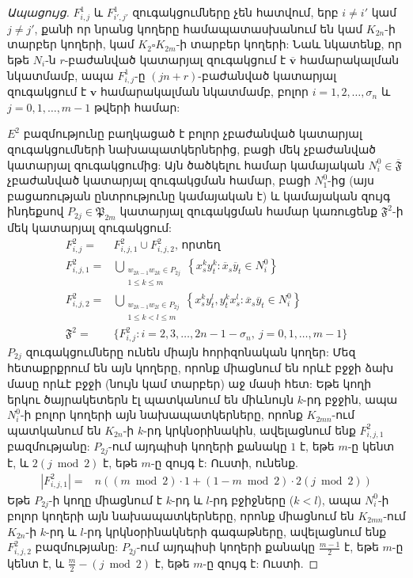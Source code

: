 \begin{proof}[Ապացույց]
$F^1_{i,j}$ և $F^1_{i',j'}$ զուգակցումները չեն հատվում, երբ $i \ne i'$ կամ $j \ne j'$, քանի որ նրանց կողերը համապատասխանում են կամ $K_{2n}$-ի տարբեր կողերի, կամ $K_2 \square K_{2m}$-ի տարբեր կողերի: Նաև նկատենք, որ եթե $N_i$-ն $r$-բաժանված կատարյալ զուգակցում է $\overline{\mathbf{v}}$ համարակալման նկատմամբ, ապա $F^1_{i,j}$-ը $(jn+r)$-բաժանված կատարյալ զուգակցում է $\mathbf{v}$ համարակալման նկատմամբ, բոլոր $i=1,2,\ldots,\sigma_n$ և $j=0,1,\ldots,m-1$ թվերի համար:

$E^2$ բազմությունը բաղկացած է բոլոր չբաժանված կատարյալ զուգակցումների նախապատկերներից, բացի մեկ չբաժանված կատարյալ զուգակցումից: Այն ծածկելու համար կամայական $N^0_i \in \overline{\mathfrak{F}}$ չբաժանված կատարյալ զուգակցման համար, բացի $N^0_1$-ից (այս բացառության ընտրությունը կամայական է) և կամայական զույգ ինդեքսով $P_{2j} \in \mathfrak{P}_{2m}$ կատարյալ զուգակցման համար կառուցենք $\mathfrak{F}^2$-ի մեկ կատարյալ զուգակցում:
\begin{align*}
F^2_{i,j} = &F^2_{i,j,1} \cup F^2_{i,j,2}\text{, որտեղ }\\
F^2_{i,j,1} = &\bigcup\limits_{\substack{w_{2k-1}w_{2k} \in P_{2j} \\ 1 \leq k \leq m}}
\left\{x_s^ky_t^k : \overline{x}_s\overline{y}_t \in N^0_i\right\} \\
F^2_{i,j,2} = &\bigcup\limits_{\substack{w_{2k-1}w_{2l} \in P_{2j} \\ 1 \leq k < l \leq m}}
\left\{x_s^ky_t^l, y_t^kx_s^l : \overline{x}_s\overline{y}_t \in N^0_i\right\}\\
\mathfrak{F}^2 = &\{F^2_{i,j} : i=2,3,\ldots,2n-1-\sigma_n,\ j=0,1,\ldots,m-1\}
\end{align*}
$P_{2j}$ զուգակցումները ունեն միայն հորիզոնական կողեր: Մեզ հետաքրքրում են այն կողերը, որոնք միացնում են որևէ բջջի ձախ մասը որևէ բջջի (նույն կամ տարբեր) աջ մասի հետ: Եթե կողի երկու ծայրակետերն էլ պատկանում են միևնույն $k$-րդ բջջին, ապա $N_i^0$-ի բոլոր կողերի այն նախապատկերները, որոնք $K_{2mn}$-ում պատկանում են $K_{2n}$-ի $k$-րդ կրկնօրինակին, ավելացնում ենք $F^2_{i,j,1}$ բազմությանը: $P_{2j}$-ում այդպիսի կողերի քանակը $1$ է, եթե $m$-ը կենտ է, և $2(j \bmod 2)$ է, եթե $m$-ը զույգ է: Ուստի, ունենք.
\begin{align*}
|F^2_{i,j,1}| = &n\left( (m \bmod 2)\cdot 1 + (1 - m \bmod 2)\cdot 2(j \bmod 2) \right)
\end{align*}
Եթե $P_{2j}$-ի կողը միացնում է $k$-րդ և $l$-րդ բջիջները ($k < l$), ապա $N_i^0$-ի բոլոր կողերի այն նախապատկերները, որոնք միացնում են $K_{2mn}$-ում $K_{2n}$-ի $k$-րդ և $l$-րդ կրկնօրինակների գագաթները, ավելացնում ենք $F^2_{i,j,2}$ բազմությանը: $P_{2j}$-ում այդպիսի կողերի քանակը $\frac{m-1}{2}$ է, եթե $m$-ը կենտ է, և $\frac{m}{2} - (j \bmod 2)$ է, եթե $m$-ը զույգ է: Ուստի.

\end{proof}
